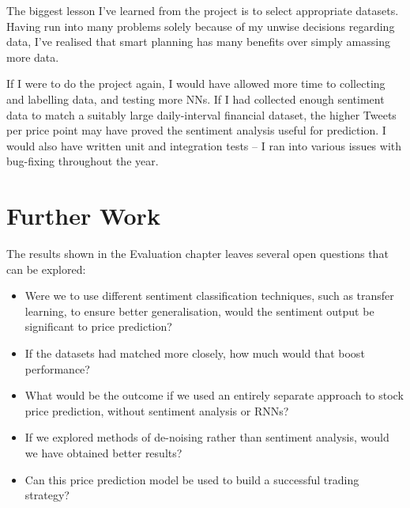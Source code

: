 \documentclass[12pt,a4paper,twoside,openright]{report}
\begin{document}
The biggest lesson I've learned from the project is to select appropriate datasets. Having
run into many problems solely because of my unwise decisions regarding data, I've realised that
smart planning has many benefits over simply amassing more data. 

If I were to do the project again, I would have allowed more time to collecting and
labelling data, and testing more NNs. If I had collected enough sentiment data to match a
suitably large daily-interval financial dataset, the higher Tweets per price point may
have proved the sentiment analysis useful for prediction.
I would also have written unit and integration tests -- I ran into
various issues with bug-fixing throughout the year.

\section{Further Work}
The results shown in the Evaluation chapter leaves several open questions
that can be explored:

\begin{itemize}
\item
Were we to use different sentiment classification techniques, such as transfer learning,
to ensure better generalisation, would the sentiment output be significant to price prediction?

\item
If the datasets had matched more closely, how much would that boost performance?

\item
What would be the outcome if we used an entirely separate approach to stock price prediction, without
sentiment analysis or RNNs?

\item
If we explored methods of de-noising rather than sentiment analysis, would we have
obtained better results?

\item
Can this price prediction model be used to build a successful trading strategy?
\end{itemize}

{\raggedleft\vfill\itshape{}\par
}

 

\end{document}
